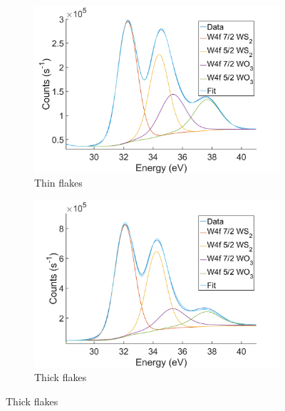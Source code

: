 \begin{figure}[!h]
	\begin{center}
		\begin{subfigure}[b]{0.4\textwidth}
			\includegraphics[width=\textwidth]{WSe2/XPSW4fThin.png}
			\caption{Thin flakes}
			\label{fig:WSe2XPSThinW}
		\end{subfigure}
		\qquad
		\begin{subfigure}[b]{0.4\textwidth}
			\includegraphics[width=\textwidth]{WSe2/XPSW4fThick.png}
			\caption{Thick flakes}
			\label{fig:WSe2XPSThickW}
		\end{subfigure}
		

\end{center}
\end{figure}
